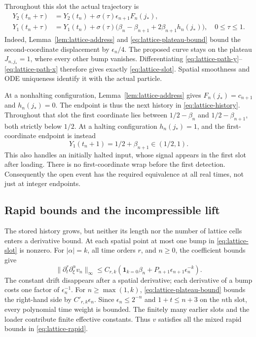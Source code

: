 Throughout this slot the actual trajectory is
\begin{align}
 Y_2(t_n+\tau)&=Y_2(t_n)+\sigma(\tau)\epsilon_{n+1}F_n(j_*),
 \label{eq:lattice-path-y}\\
 Y_1(t_n+\tau)&=Y_1(t_n)+\sigma(\tau)
  \bigl(\beta_n-\beta_{n+1}+2\beta_{n+1}h_n(j_*)\bigr),
 \quad 0\le\tau\le1.
 \label{eq:lattice-path-x}
\end{align}
Indeed, Lemma~\ref{lem:lattice-address} and
\eqref{eq:lattice-plateau-bound} bound the second-coordinate
displacement by $\epsilon_n/4$.  The proposed curve stays on the
plateau $J_{n,j_*}=1$, where every other bump vanishes.  Differentiating
\eqref{eq:lattice-path-y}--\eqref{eq:lattice-path-x} therefore gives
exactly \eqref{eq:lattice-slot}.  Spatial smoothness and ODE uniqueness
identify it with the actual particle.

At a nonhalting configuration, Lemma~\ref{lem:lattice-address} gives
$F_n(j_*)=c_{n+1}$ and $h_n(j_*)=0$.  The endpoint is thus the next
history in \eqref{eq:lattice-history}.  Throughout that slot the first
coordinate lies between $1/2-\beta_n$ and $1/2-\beta_{n+1}$, both
strictly below $1/2$.  At a halting configuration $h_n(j_*)=1$, and
the first-coordinate endpoint is instead
\[
 Y_1(t_n+1)=1/2+\beta_{n+1}\in(1/2,1).
\]
This also handles an initially halted input, whose signal appears in
the first slot after loading.  There is no first-coordinate wrap before
the first detection.  Consequently the open event has the required
equivalence at all real times, not just at integer endpoints.

\subsection{Rapid bounds and the incompressible lift}

The stored history grows, but neither its length nor the number of
lattice cells enters a derivative bound.  At each spatial point at most
one bump in \eqref{eq:lattice-slot} is nonzero.  For $|\alpha|=k$,
all time orders $r$, and $n\ge0$, the coefficient bounds give
\begin{equation}\label{eq:lattice-slot-bound}
 \|\partial_t^r\partial_\xi^\alpha v_n\|_\infty
 \le C_{r,k}\left(\mathbf 1_{k=0}\beta_n
       +P_{n+1}\epsilon_{n+1}\epsilon_n^{-k}\right).
\end{equation}
The constant drift disappears after a spatial derivative; each derivative
of a bump costs one factor of $\epsilon_n^{-1}$.  For
$n\ge\max(1,k)$, \eqref{eq:lattice-plateau-bound} bounds the
right-hand side by $C'_{r,k}\epsilon_n$.  Since
$\epsilon_n\le2^{-n}$ and $1+t\le n+3$ on the $n$th slot,
every polynomial time weight is bounded.  The finitely many earlier
slots and the loader contribute finite effective constants.  Thus $v$
satisfies all the mixed rapid bounds in \eqref{eq:lattice-rapid}.

